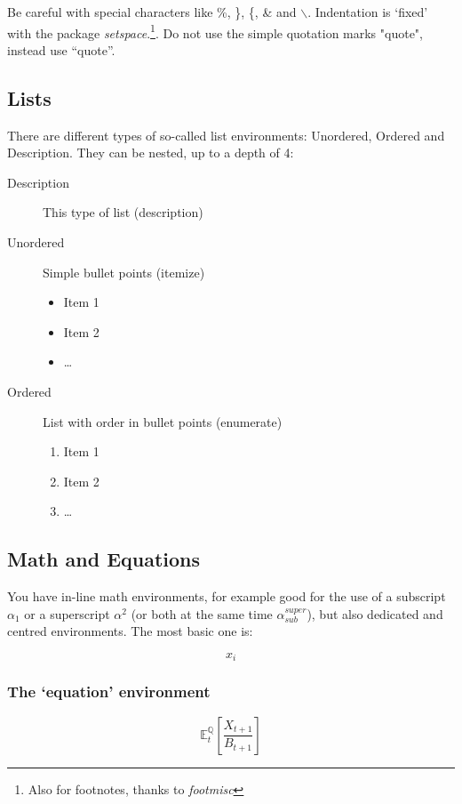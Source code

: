 \documentclass[11pt,a4paper,english,oneside]{book}
\begin{document}
Be careful with special characters like  \%, \}, \{, \& and \(\backslash\). Indentation is `fixed' with  the  package \emph{setspace}.\footnote{Also for footnotes, thanks to \emph{footmisc}\label{ft:randomfootnote}}. Do not use the simple quotation marks "quote", instead use ``quote''.

\subsection{Lists}
There are different types of so-called list environments: Unordered, Ordered and Description. They can be nested, up to a depth of 4:

\begin{description}
    \item[Description] This type of list (description)
    \item[Unordered] Simple bullet points (itemize)
    \begin{itemize}
        \item Item 1
        \item Item 2
        \item \ldots
    \end{itemize} 
    \item[Ordered] List with order in bullet points (enumerate)
    \begin{enumerate}
        \item Item 1
        \item Item 2
        \item \ldots
    \end{enumerate} 
\end{description}


\subsection{Math and Equations}
You have in-line math environments, for example good for the use of a subscript \(\alpha_1\) or a superscript \(\alpha^2\) (or both at the same time \(\alpha_{sub}^{super}\)), but also dedicated and centred environments. The most basic one is:

\[ x_i \]

\subsubsection{The `equation' environment}
\begin{equation}
    \mathbb{E}^{\mathbb{Q}}_t\left[\frac{X_{t+1}}{B_{t+1}}\right]
\end{equation}
\end{document}

